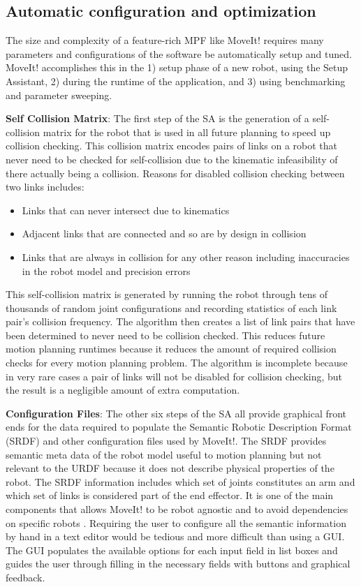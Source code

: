 \documentclass[10pt,journal,compsoc]{joser1}
\begin{document}
{%
\subsection{Automatic configuration and optimization}

The size and complexity of a feature-rich MPF like MoveIt! requires many parameters and configurations of the software be automatically setup and tuned. MoveIt! accomplishes this in the 1) setup phase of a new robot, using the Setup Assistant, 2) during the runtime of the application, and 3) using benchmarking and parameter sweeping.

{\bf Self Collision Matrix}: The first step of the SA is the generation of a self-collision matrix for the robot that is used in all future planning to speed up collision checking. This collision matrix encodes pairs of links on a robot that never need to be checked for self-collision due to the kinematic infeasibility of there actually being a collision. Reasons for disabled collision checking between two links includes:
 
\begin{itemize}
    \item Links that can never intersect due to kinematics
    \item Adjacent links that are connected and so are by design in collision
    \item Links that are always in collision for any other reason including inaccuracies in the robot model and precision errors
\end{itemize}

This self-collision matrix is generated by running the robot through tens of thousands of random joint configurations and recording statistics of each link pair's collision frequency. The algorithm then creates a list of link pairs that have been determined to never need to be collision checked. This reduces future motion planning runtimes because it reduces the amount of required collision checks for every motion planning problem. The algorithm is incomplete because in very rare cases a pair of links will not be disabled for collision checking, but the result is a negligible amount of extra computation.

{\bf Configuration Files}: The other six steps of the SA all provide graphical front ends for the data required to populate the Semantic Robotic Description Format (SRDF) and other configuration files used by MoveIt!. The SRDF provides semantic meta data of the robot model useful to motion planning but not relevant to the URDF because it does not describe physical properties of the robot. The SRDF information includes which set of joints constitutes an arm and which set of links is considered part of the end effector. It is one of the main components that allows MoveIt! to be robot agnostic and to avoid dependencies on specific robots \cite{moveit}. Requiring the user to configure all the semantic information by hand in a text editor would be tedious and more difficult than using a GUI. The GUI populates the available options for each input field in list boxes and guides the user through filling in the necessary fields with buttons and graphical feedback.

}
\end{document}
